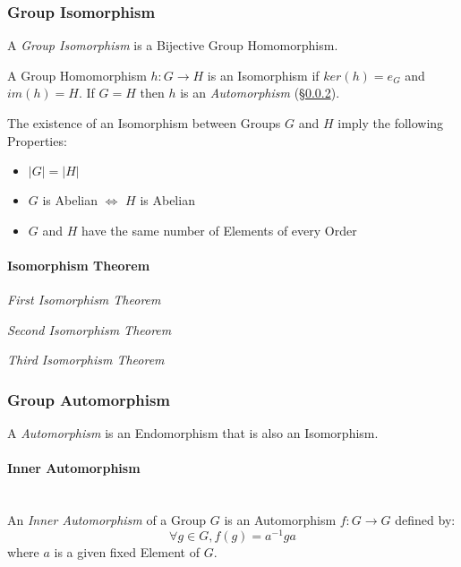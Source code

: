 \subsubsection{Group Isomorphism}\label{sec:group_isomorphism}

A \emph{Group Isomorphism} is a Bijective Group Homomorphism.

A Group Homomorphism $h : G \rightarrow H$ is an Isomorphism if
$ker(h) = e_G$ and $im(h) = H$. If $G = H$ then $h$ is an
\emph{Automorphism} (\S\ref{sec:group_automorphism}).

The existence of an Isomorphism between Groups $G$ and $H$ imply the
following Properties:
\begin{itemize}
    \item $|G| = |H|$
    \item $G$ is Abelian $\Leftrightarrow$ $H$ is Abelian
    \item $G$ and $H$ have the same number of Elements of every Order
\end{itemize}



\paragraph{Isomorphism Theorem}\label{sec:isomorphism_theorem}

\emph{First Isomorphism Theorem}

\emph{Second Isomorphism Theorem}

\emph{Third Isomorphism Theorem}



\subsubsection{Group Automorphism}\label{sec:group_automorphism}

A \emph{Automorphism} is an Endomorphism that is also an Isomorphism.



\paragraph{Inner Automorphism}\label{sec:inner_automorphism}
\hfill \\

An \emph{Inner Automorphism} of a Group $G$ is an Automorphism $f : G
\rightarrow G$ defined by:
\[
    \forall g \in G, f(g) = a^{-1}ga
\]
where $a$ is a given fixed Element of $G$.



